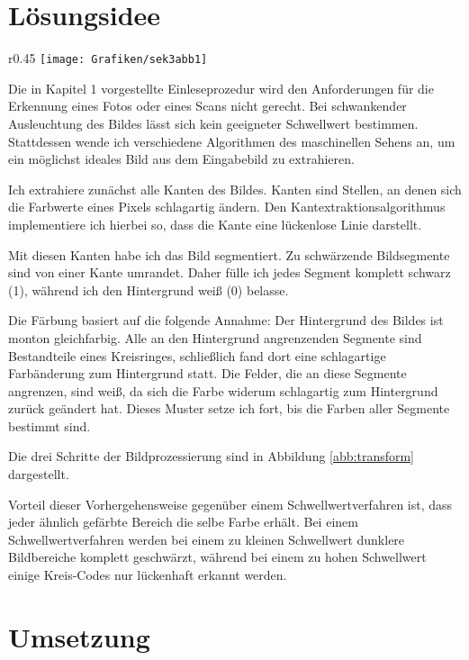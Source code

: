 \section{Lösungsidee}
\begin{wrapfigure}{r}{0.45\textwidth}
	\setlength\intextsep{0pt}
	\centering	
	\texttt{[image: Grafiken/sek3abb1]}
	\caption{Verbesserte Bilderkennung}
	\label{abb:transform}
\end{wrapfigure}
Die in Kapitel 1 vorgestellte Einleseprozedur wird den Anforderungen für die Erkennung eines Fotos oder eines Scans nicht gerecht. Bei schwankender Ausleuchtung des Bildes lässt sich kein geeigneter Schwellwert bestimmen. Stattdessen wende ich verschiedene Algorithmen des maschinellen Sehens an, um ein möglichst ideales Bild aus dem Eingabebild zu extrahieren.

Ich extrahiere zunächst alle Kanten des Bildes. Kanten sind Stellen, an denen sich die Farbwerte eines Pixels schlagartig ändern. Den Kantextraktionsalgorithmus implementiere ich hierbei so, dass die Kante eine lückenlose Linie darstellt.

Mit diesen Kanten habe ich das Bild segmentiert. Zu schwärzende Bildsegmente sind von einer Kante umrandet. Daher fülle ich jedes Segment komplett schwarz (1), während ich den Hintergrund weiß (0) belasse.

Die Färbung basiert auf die folgende Annahme: Der Hintergrund des Bildes ist monton gleichfarbig. Alle an den Hintergrund angrenzenden Segmente sind Bestandteile eines Kreisringes, schließlich fand dort eine schlagartige Farbänderung zum Hintergrund statt. Die Felder, die an diese Segmente angrenzen, sind weiß, da sich die Farbe widerum schlagartig zum Hintergrund zurück geändert hat. Dieses Muster setze ich fort, bis die Farben aller Segmente bestimmt sind.

Die drei Schritte der Bildprozessierung sind in Abbildung \ref{abb:transform} dargestellt.

Vorteil dieser Vorhergehensweise gegenüber einem Schwellwertverfahren ist, dass jeder ähnlich gefärbte Bereich die selbe Farbe erhält. Bei einem Schwellwertverfahren werden bei einem zu kleinen Schwellwert dunklere Bildbereiche komplett geschwärzt, während bei einem zu hohen Schwellwert einige Kreis-Codes nur lückenhaft erkannt werden.
 
\section{Umsetzung}
